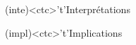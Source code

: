 \documentclass[../../main/main.tex]{subfiles}
\begin{document}
\begin{tcn}[%
		sidebyside, fontupper=\small, fontlower=\small
	]
	\begin{tcn}[nsp](inte)<ctc>'t'{Interprétations}
	\end{tcn}
	\begin{tcn}[nsp](impl)<ctc>'t'{Implications}

\end{tcn}
\end{tcn}
\end{document}
